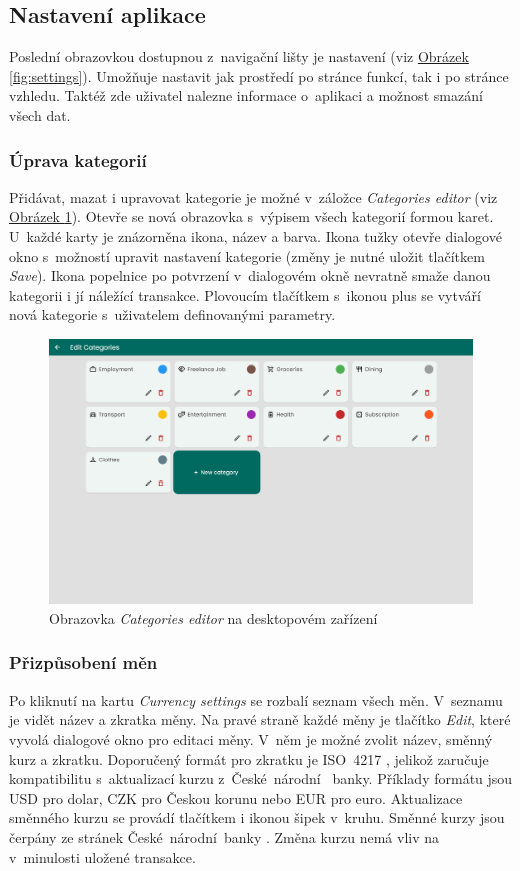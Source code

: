 \documentclass[
  biblatex,
  figures=true,
  tables=false,
  glossaries,
  index
]{kidiplom}
\begin{document}
\subsection{Nastavení aplikace}
Poslední obrazovkou dostupnou z~navigační lišty je nastavení (viz \hyperref[fig:settings]{Obrázek \ref{fig:settings}}). Umožňuje nastavit jak prostředí po stránce funkcí, tak i po stránce vzhledu. Taktéž zde uživatel nalezne informace o~aplikaci a možnost smazání všech dat.

\subsubsection{Úprava kategorií}
Přidávat, mazat i upravovat kategorie je možné v~záložce \textit{Categories editor} (viz \hyperref[fig:categories-editor]{Obrázek \ref{fig:categories-editor}}). Otevře se nová obrazovka s~výpisem všech kategorií formou karet. U~každé karty je znázorněna ikona, název a barva. Ikona tužky otevře dialogové okno s~možností upravit nastavení kategorie (změny je nutné uložit tlačítkem \textit{Save}). Ikona popelnice po potvrzení v~dialogovém okně nevratně smaže danou kategorii i jí náležící transakce. Plovoucím tlačítkem s~ikonou plus se vytváří nová kategorie s~uživatelem definovanými parametry.

\begin{figure}
  \centering
  \includegraphics[width=\textwidth]{images/categories-editor-large.png}
  \caption{Obrazovka \textit{Categories editor} na desktopovém zařízení}
  \label{fig:categories-editor}
\end{figure}

\subsubsection{Přizpůsobení měn}
Po kliknutí na kartu \textit{Currency settings} se rozbalí seznam všech měn. V~seznamu je vidět název a zkratka měny. Na pravé straně každé měny je tlačítko \textit{Edit}, které vyvolá dialogové okno pro editaci měny. V~něm je možné zvolit název, směnný kurz a zkratku. Doporučený formát pro zkratku je  ISO~4217 \cite{iso4217}, jelikož zaručuje kompatibilitu s~aktualizací kurzu z~České~národní ~banky. Příklady formátu jsou USD pro dolar, CZK pro Českou korunu nebo EUR pro euro. Aktualizace směnného kurzu se provádí tlačítkem i ikonou šipek v~kruhu. Směnné kurzy jsou čerpány ze stránek České~národní~banky \cite{cnb-kurzy}. Změna kurzu nemá vliv na v~minulosti uložené transakce.
\end{document}
